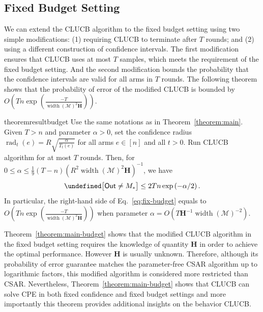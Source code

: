 \documentclass{article}
\newcommand{\Algorithm}{{\small \textsf{CLUCB}}\xspace}
\newcommand{\AlgorithmBud}{{\small \textsf{CSAR}}\xspace}
\newcommand{\Problem}{{CPE}\xspace}
\newcommand{\Rew}{\varphi}
\newcommand{\M}{\mathcal M}
\newcommand{\B}{\mathcal B}
\newcommand{\RR}{\mathbb R}
\DeclareMathOperator{\rank}{width}
\DeclareMathOperator{\rad}{rad}
\newcommand{\out}{\mathsf{Out}}
\let\Pr\undefined
\DeclareMathOperator{\Pr}{Pr}
\newcommand{\MultiIdent}{\textsc{TopK}\xspace}
\renewcommand{\vec}[1]{\boldsymbol{#1}}
\begin{document}
\subsection{Fixed Budget Setting}
\label{section:fixed-budget}
We can extend the \Algorithm algorithm to the fixed budget setting using two simple modifications: (1) requiring \Algorithm to terminate after $T$ rounds; and (2) using a different construction of confidence intervals.
The first modification ensures that \Algorithm uses at most $T$ samples, which meets the requirement of the fixed budget setting.
And the second modification bounds the probability that the confidence intervals are valid for all arms in $T$ rounds.
The following theorem shows that the probability of error of the modified \Algorithm is bounded by 
$O\left(Tn\exp\left(\frac{-T}{\rank(\M)^2\mathbf H} \right)\right)$.
\begin{restatable}{theorem}{resultbudget}
Use the same notations as in Theorem~\ref{theorem:main}.
Given $T > n$ and parameter $\alpha > 0$, set the confidence radius $\rad_t(e) = R\sqrt{\frac{\alpha}{T_t(e)}}$ for all arms $e\in[n]$ and all $t>0$.
Run \Algorithm algorithm for at most $T$ rounds.
Then, for $0 \le \alpha \le \frac19 (T-n)\left(R^2\rank(\M)^2 \mathbf H\right)^{-1}$, we have
\begin{equation}
\label{eq:fix-budget}
\Pr\big[\out\not=M_*\big] \le 2Tn\exp\left(-\alpha/2\right).
\end{equation}
In particular, the right-hand side of Eq.~\eqref{eq:fix-budget} equals to $O\left(Tn\exp\left(\frac{-T}{\rank(\M)^2\mathbf H} \right)\right)$
when parameter $\alpha = O(T\mathbf H^{-1}\rank(\M)^{-2})$.
\label{theorem:main-budget}
\end{restatable}

Theorem~\ref{theorem:main-budget} shows that the modified \Algorithm algorithm in the fixed budget setting requires the knowledge of  quantity $\mathbf H$ in order to achieve the optimal performance. 
However $\mathbf H$ is usually unknown.
Therefore, although its probability of error guarantee matches the parameter-free \AlgorithmBud algorithm up to logarithmic factors, this modified algorithm is considered more restricted than \AlgorithmBud. 
Nevertheless, Theorem~\ref{theorem:main-budget} shows that \Algorithm can solve \Problem in both fixed confidence and fixed budget settings  and more importantly this theorem provides additional insights on the behavior \Algorithm.
\end{document}
